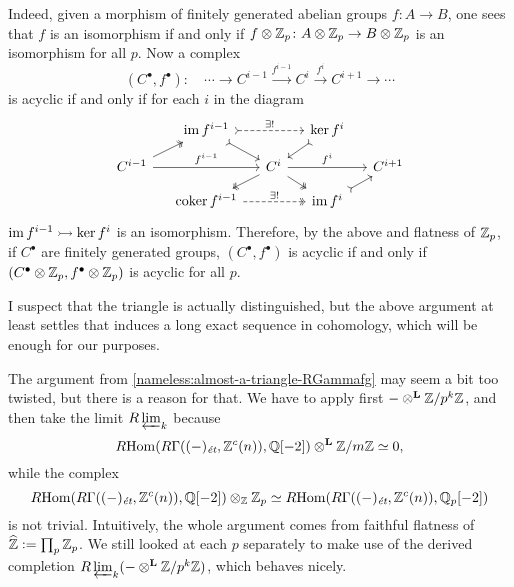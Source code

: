 \begin{nameless}
  Indeed, given a morphism of finitely generated abelian groups
  $f\colon A\to B$, one sees that $f$ is an isomorphism if and only if
  $f\otimes\mathbb{Z}_p\colon A\otimes\mathbb{Z}_p\to B\otimes\mathbb{Z}_p$ is an isomorphism for all
  $p$. Now a complex
  \[ (C^\bullet,f^\bullet)\colon\quad
    \cdots \to C^{i-1} \xrightarrow{f^{i-1}}
    C^i \xrightarrow{f^i} C^{i+1} \to \cdots \]
  is acyclic if and only if for each $i$ in the diagram
  \[ \begin{tikzcd}[row sep=small, column sep=small]
      & \im f^{i-1}\ar[rightarrowtail,dashed]{rr}{\exists !}\ar[rightarrowtail]{dr} & & \ker f^i\ar[rightarrowtail]{dl} \\
      C^{i-1}\ar{rr}{f^{i-1}}\ar[twoheadrightarrow]{ur} & & C^i\ar{rr}{f^i}\ar[twoheadrightarrow]{dl}\ar[twoheadrightarrow]{dr} & & C^{i+1} \\
      & \coker f^{i-1}\ar[twoheadrightarrow,dashed]{rr}{\exists !} & & \im f^i\ar[rightarrowtail]{ur}
    \end{tikzcd} \]
  $\operatorname{im} f^{i-1} \rightarrowtail \ker f^i$ is an isomorphism. Therefore, by the
  above and flatness of $\mathbb{Z}_p$, if $C^\bullet$ are finitely generated groups,
  $(C^\bullet,f^\bullet)$ is acyclic if and only if
  $(C^\bullet\otimes\mathbb{Z}_p,f^\bullet\otimes\mathbb{Z}_p)$ is acyclic for all $p$.

  I suspect that the triangle 
  is actually distinguished, but the above argument at least settles that
   induces a long exact
  sequence in cohomology, which will be enough for our purposes.
\end{nameless}

\begin{remark}
  The argument from \ref{nameless:almost-a-triangle-RGammafg} may seem a bit too
  twisted, but there is a reason for that. We have to apply first
  $-\otimes^\mathbf{L} \mathbb{Z}/p^k\mathbb{Z}$, and then take the limit $R\varprojlim_k$ because
  $$R\!\operatorname{Hom} (R\Gamma ((-)_\text{\it ét}, \mathbb{Z}^c (n)), \mathbb{Q} [-2]) \otimes^\mathbf{L} \mathbb{Z}/m\mathbb{Z} \simeq 0,$$
  while the complex
  \[ R\!\operatorname{Hom} (R\Gamma ((-)_\text{\it ét}, \mathbb{Z}^c (n)), \mathbb{Q} [-2]) \otimes_{\mathbb{Z}} \mathbb{Z}_p \simeq
    R\!\operatorname{Hom} (R\Gamma ((-)_\text{\it ét}, \mathbb{Z}^c (n)), \mathbb{Q}_p [-2]) \]
  is not trivial. Intuitively, the whole argument comes from faithful flatness
  of $\widehat{\mathbb{Z}} \mathrel{\mathop:}= \prod_p \mathbb{Z}_p$. We still looked at each $p$ separately
  to make use of the derived completion
  $R\varprojlim_k (-\otimes^\mathbf{L} \mathbb{Z}/p^k\mathbb{Z})$, which behaves nicely.
\end{remark}

